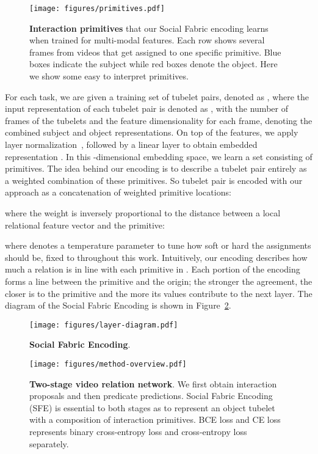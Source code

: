 \documentclass[10pt,twocolumn,letterpaper]{article}
\begin{document}
\begin{figure}[t!]
\centering
    \texttt{[image: figures/primitives.pdf]}
  \caption{\textbf{Interaction primitives} that our Social Fabric encoding learns when trained for multi-modal features. Each row shows several frames from videos that get assigned to one specific primitive. Blue boxes indicate the subject while red boxes denote the object. Here we show some easy to interpret primitives. 
  }
\label{fig:primitives}
\end{figure}


For each task, we are given a training set of tubelet pairs, denoted as , where the input representation of each tubelet pair is denoted as , with  the number of frames of the tubelets and  the feature dimensionality for each frame, denoting the combined subject and object representations. On top of the features, we apply layer normalization~\cite{ba2016layer}, followed by a linear layer to obtain embedded representation . In this -dimensional embedding space, we learn a set  consisting of  primitives. The idea behind our encoding is to describe a tubelet pair entirely as a weighted combination of these primitives. So tubelet pair  is encoded with our approach as a concatenation of weighted primitive locations:

where the weight is inversely proportional to the distance between a local relational feature vector and the primitive:

where  denotes a temperature parameter to tune how soft or hard the assignments should be, fixed to  throughout this work. Intuitively, our encoding describes how much a relation is in line with each primitive in . Each portion  of the encoding forms a line between the primitive  and the origin; the stronger the agreement, the closer  is to the primitive and the more its values contribute to the next layer. The diagram of the Social Fabric Encoding is shown in Figure~\ref{fig:SFE}.

\begin{figure}[b!]
\centering
    \texttt{[image: figures/layer-diagram.pdf]}
    \vspace{-0.1cm}
  \caption{\textbf{Social Fabric Encoding}.
  }
\label{fig:SFE}
\end{figure}


\begin{figure*}[t]
\begin{center}
\texttt{[image: figures/method-overview.pdf]}
\end{center}
  \caption{
\textbf{Two-stage video relation network}. We first obtain interaction proposals and then predicate predictions. Social Fabric Encoding (SFE) is essential to both stages as to represent an object tubelet with a composition of interaction primitives. BCE loss and CE loss represents binary cross-entropy loss and cross-entropy loss separately.}
\label{fig:overview}
\end{figure*}
\end{document}
